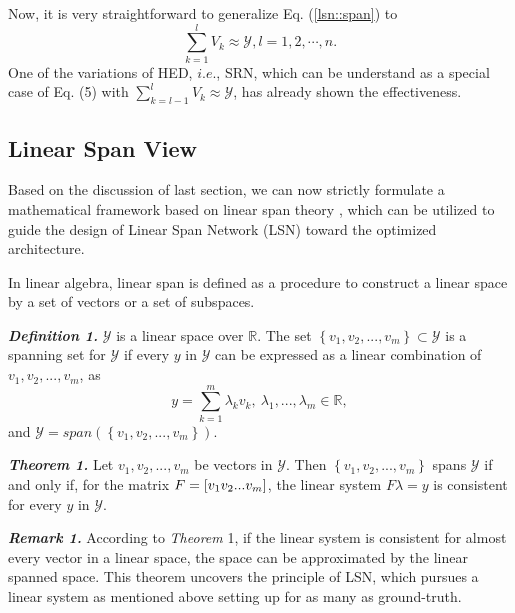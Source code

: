 \documentclass[runningheads]{llncs}
\begin{document}
Now, it is very straightforward to generalize Eq. (\ref{lsn::span}) to 
\begin{equation}
   \sum\limits_{k = 1}^l {{V_k}} \approx \mathcal{Y}, l=1,2,\cdots,n.
   \label{genera::span}
\end{equation}
One of the variations of HED, $i.e.$, SRN, which can be understand as a special case of Eq. (5) with $\sum\nolimits_{k = l - 1}^l {{V_k}} \approx \mathcal{Y}$, has already shown the effectiveness.





\subsection{Linear Span View}

Based on the discussion of last section, we can now strictly formulate a mathematical framework based on linear span theory \cite{ref30}, which can be utilized to guide the design of Linear Span Network (LSN) toward the optimized architecture. 

In linear algebra, linear span is defined as a procedure to construct a linear space by a set of vectors or a set of subspaces.

\textbf{\textit{Definition 1.}} $\mathcal{Y}$ is a linear space over ${ \mathbb{R}}$. The set $\left\{ {{v_1},{v_2},...,{v_m}} \right\} \subset \mathcal{Y}$ is a spanning set for $\mathcal{Y}$ if every $y$ in $\mathcal{Y}$ can be expressed as a linear combination of ${v_1},{v_2},...,{v_m}$, as
\begin{equation}
    y = \sum\limits_{k=1}^{m} {{\lambda_k}{v_k}}, \ \lambda_1,...,\lambda_m \in \mathbb{R},
    \label{ls:def1}
\end{equation}
and $\mathcal{Y}=span(\left\{ {{v_1},{v_2},...,{v_m}}\right\})$.

\textbf{\textit{Theorem 1.} } Let ${v_1},{v_2},...,{v_m}$ be vectors in $\mathcal{Y}$. Then $\left\{ {{v_1},{v_2},...,{v_m}} \right\}$ spans $\mathcal{Y}$ if and only if, for the matrix $F = \left[ {{v_1}{\rm{  }}{v_2}{\rm{  }}...{\rm{  }}{v_m}} \right]$, the linear system $F\lambda = y$ is consistent for every $y$ in $\mathcal{Y}$. 

\textbf{\textit{Remark 1.} } According to \textit{Theorem} 1, if the linear system is consistent for almost every vector in a linear space, the space can be approximated by the linear spanned space. This theorem uncovers the principle of LSN, which pursues a linear system as mentioned above setting up for as many as ground-truth.
\end{document}
